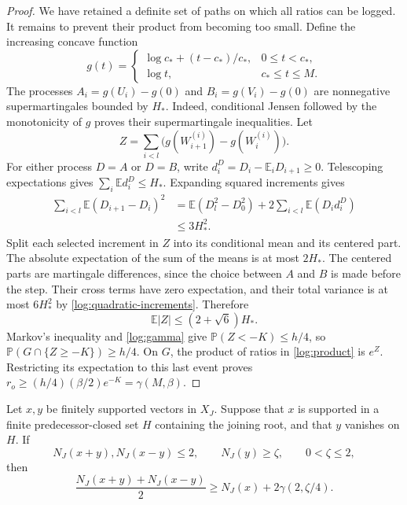 \begin{proof}
We have retained a definite set of paths on which all ratios can be
logged.  It remains to prevent their product from becoming too small.
Define the increasing concave function
\[
 g(t)=\begin{cases}
 \log c_*+(t-c_*)/c_*,&0\le t<c_*,\\
 \log t,&c_*\le t\le M.
 \end{cases}
\]
The processes $A_i=g(U_i)-g(0)$ and $B_i=g(V_i)-g(0)$ are
nonnegative supermartingales bounded by $H_*$.  Indeed, conditional
Jensen followed by the monotonicity of $g$ proves their supermartingale
inequalities.  Let
\[
 Z=\sum_{i<l}\bigl(g(W_{i+1}^{(i)})-g(W_i^{(i)})\bigr).
\]
For either process $D=A$ or $D=B$, write
$d_i^D=D_i-\mathbb E_iD_{i+1}\ge0$.  Telescoping expectations gives
$\sum_i\mathbb E d_i^D\le H_*$.  Expanding squared increments gives
\begin{equation}\label{log:quadratic-increments}
 \begin{split}
 \sum_{i<l}\mathbb E(D_{i+1}-D_i)^2
 &=\mathbb E(D_l^2-D_0^2)+2\sum_{i<l}\mathbb E(D_i d_i^D)\\
 &\le3H_*^2.
 \end{split}
\end{equation}
Split each selected increment in $Z$ into its conditional mean and
its centered part.  The absolute expectation of the sum of the means
is at most $2H_*$.  The centered parts are martingale differences,
since the choice between $A$ and $B$ is made before the step.  Their
cross terms have zero expectation, and their total variance is at
most $6H_*^2$ by \eqref{log:quadratic-increments}.  Therefore
\begin{equation}\label{log:increment-bound}
 \mathbb E|Z|\le(2+\sqrt6)H_*.
\end{equation}
Markov's inequality and \eqref{log:gamma} give
$\mathbb P(Z<-K)\le h/4$, so
$\mathbb P(G\cap\{Z\ge-K\})\ge h/4$.  On $G$, the product of
ratios in \eqref{log:product} is $e^Z$.  Restricting its expectation
to this last event proves
$r_o\ge (h/4)(\beta/2)e^{-K}=\gamma(M,\beta)$.
\end{proof}

\begin{lemma}\label{log:tail-gap}
Let $x,y$ be finitely supported vectors in $X_J$.  Suppose that $x$
is supported in a finite predecessor-closed set $H$ containing the
joining root, and that $y$ vanishes on $H$.  If
\[
 N_J(x+y),N_J(x-y)\le2,
 \qquad N_J(y)\ge\zeta,\qquad 0<\zeta\le2,
\]
then
\[
 \frac{N_J(x+y)+N_J(x-y)}2
 \ge N_J(x)+2\gamma(2,\zeta/4).
\]
\end{lemma}

